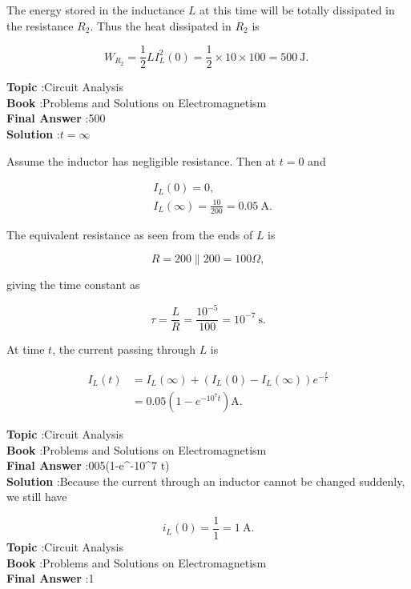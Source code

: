 \documentclass[10pt]{article}
\begin{document}
The energy stored in the inductance $L$ at this time will be totally dissipated in the resistance $R_{2}$. Thus the heat dissipated in $R_{2}$ is

$$
W_{R_{2}}=\frac{1}{2} L I_{L}^{2}(0)=\frac{1}{2} \times 10 \times 100=500 \mathrm{~J} \text {. }
$$

\textbf{Topic} :Circuit Analysis\\
\textbf{Book} :Problems and Solutions on Electromagnetism\\
\textbf{Final Answer} :500 \\


\textbf{Solution} :$t=\infty$

Assume the inductor has negligible resistance. Then at $t=0$ and

$$
\begin{aligned}
&I_{L}(0)=0, \\
&I_{L}(\infty)=\frac{10}{200}=0.05 \mathrm{~A} .
\end{aligned}
$$

The equivalent resistance as seen from the ends of $L$ is

$$
R=200 \| 200=100 \Omega,
$$

giving the time constant as

$$
\tau=\frac{L}{R}=\frac{10^{-5}}{100}=10^{-7} \mathrm{~s} .
$$

At time $t$, the current passing through $L$ is

$$
\begin{aligned}
I_{L}(t) &=I_{L}(\infty)+\left(I_{L}(0)-I_{L}(\infty)\right) e^{-\frac{t}{r}} \\
&=0.05\left(1-e^{-10^{7} t}\right) \mathrm{A} .
\end{aligned}
$$

\textbf{Topic} :Circuit Analysis\\
\textbf{Book} :Problems and Solutions on Electromagnetism\\
\textbf{Final Answer} :005\left(1-e^{-10^{7} t}\right) \\


\textbf{Solution} :Because the current through an inductor cannot be changed suddenly, we still have

$$
i_{L}(0)=\frac{1}{1}=1 \mathrm{~A} .
$$
\textbf{Topic} :Circuit Analysis\\
\textbf{Book} :Problems and Solutions on Electromagnetism\\
\textbf{Final Answer} :1 \\
\end{document}
